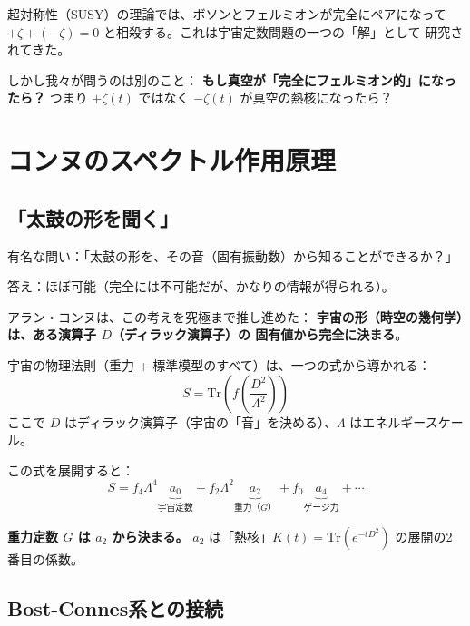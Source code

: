 \documentclass[11pt,a4paper]{article}
\begin{document}
超対称性（SUSY）の理論では、ボソンとフェルミオンが完全にペアになって
$+\zeta + (-\zeta) = 0$ と相殺する。これは宇宙定数問題の一つの「解」として
研究されてきた。

しかし我々が問うのは別のこと：
\textbf{もし真空が「完全にフェルミオン的」になったら？}
つまり $+\zeta(t)$ ではなく $-\zeta(t)$ が真空の熱核になったら？


\section{コンヌのスペクトル作用原理}

\subsection{「太鼓の形を聞く」}

有名な問い：「太鼓の形を、その音（固有振動数）から知ることができるか？」

答え：ほぼ可能（完全には不可能だが、かなりの情報が得られる）。

アラン・コンヌは、この考えを究極まで推し進めた：
\textbf{宇宙の形（時空の幾何学）は、ある演算子 $D$（ディラック演算子）の
固有値から完全に決まる}。

\begin{tcolorbox}[colback=yellow!5,colframe=yellow!50!black,title=コンヌのスペクトル作用原理]
宇宙の物理法則（重力 + 標準模型のすべて）は、一つの式から導かれる：
\begin{equation}
  S = \mathrm{Tr}\!\left(f\!\left(\frac{D^2}{\Lambda^2}\right)\right)
\end{equation}
ここで $D$ はディラック演算子（宇宙の「音」を決める）、$\Lambda$ はエネルギースケール。
\end{tcolorbox}

この式を展開すると：
\begin{equation}
  S = f_4 \Lambda^4 \underbrace{a_0}_{\text{宇宙定数}}
    + f_2 \Lambda^2 \underbrace{a_2}_{\text{重力（$G$）}}
    + f_0 \underbrace{a_4}_{\text{ゲージ力}} + \cdots
\end{equation}

\textbf{重力定数 $G$ は $a_2$ から決まる。}
$a_2$ は「熱核」$K(t) = \mathrm{Tr}(e^{-tD^2})$ の展開の2番目の係数。


\subsection{Bost-Connes系との接続}
\end{document}
